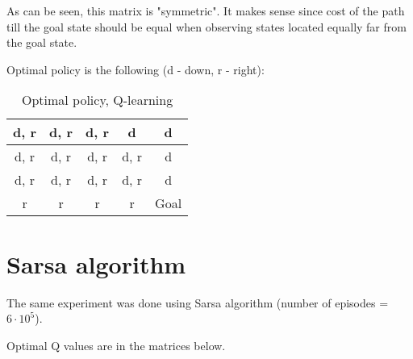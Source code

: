 \documentclass{article}
\begin{document}
As can be seen, this matrix is "symmetric". It makes sense since cost of the path till the goal state should be equal when observing states located equally far from the goal state.

Optimal policy is the following (d - down, r - right):

\begin{table*}[h!]
\centering
\begin{tabular}{|c|c|c|c|c|}
\hline
d, r&	d, r	&d, r	&d	&d\\
\hline
d, r	&d, r&	d, r&	d, r&	d\\
\hline
d, r	&d, r	&d, r	&d, r	&d\\
\hline
r	&r&	r	&r	&Goal\\
\hline
\end{tabular}
\caption{Optimal policy, Q-learning}	
\end{table*}

\section{Sarsa algorithm}

The same experiment was done using Sarsa algorithm (number of episodes = $6 \cdot 10^5$). 

Optimal Q values are in the matrices below.
\end{document}
